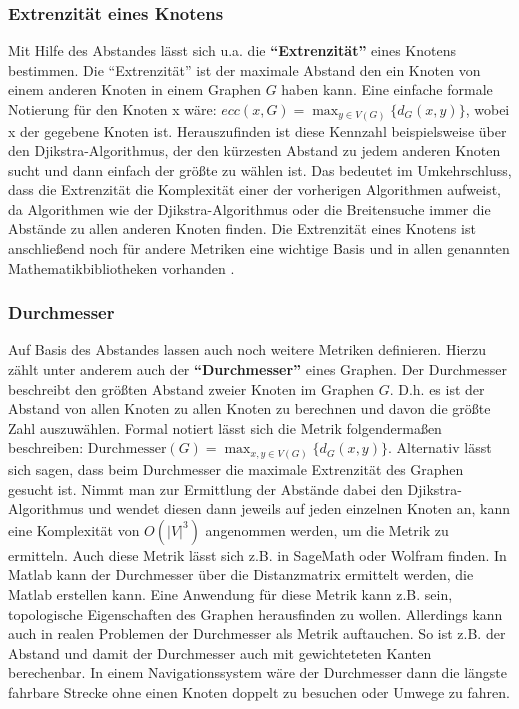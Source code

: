 \documentclass[a4paper,12pt,ngerman,chapterprefix=false,listof=totoc,bibliography=totoc]{scrreprt}
\begin{document}
\subsubsection*{Extrenzität eines Knotens}
{
Mit Hilfe des Abstandes lässt sich u.a. die \textbf{"`Extrenzität"'} eines Knotens bestimmen. Die "`Extrenzität"' ist der maximale Abstand den ein Knoten von einem anderen Knoten in einem Graphen \(G\) haben kann. Eine einfache formale Notierung für den Knoten x wäre: \(ecc(x, G)=\max_{y\in V(G)}\{d_G(x,y)\}\), wobei x der gegebene Knoten ist. \cite{harary_graph_2001} Herauszufinden ist diese Kennzahl beispielsweise über den Djikstra-Algorithmus, der den kürzesten Abstand zu jedem anderen Knoten sucht und dann einfach der größte zu wählen ist. Das bedeutet im Umkehrschluss, dass die Extrenzität die Komplexität einer der vorherigen Algorithmen aufweist, da Algorithmen wie der Djikstra-Algorithmus oder die Breitensuche immer die Abstände zu allen anderen Knoten finden. Die Extrenzität eines Knotens ist anschließend noch für andere Metriken eine wichtige Basis und in allen genannten Mathematikbibliotheken vorhanden \cite{sagemath_graph_2020,matlab_shortest_2020,wolfram_graph_2020}.
}
\subsubsection*{Durchmesser}
{
Auf Basis des Abstandes lassen auch noch weitere Metriken definieren. Hierzu zählt unter anderem auch der \textbf{"`Durchmesser"'} eines Graphen. Der Durchmesser beschreibt den größten Abstand zweier Knoten im Graphen \(G\). \cite{diestel_graphentheorie_2000} D.h. es ist der Abstand von allen Knoten zu allen Knoten zu berechnen und davon die größte Zahl auszuwählen. Formal notiert lässt sich die Metrik folgendermaßen beschreiben: \(\text{Durchmesser}(G)=\max_{x,y\in V(G)}\{ d_G (x,y)\}\). Alternativ lässt sich sagen, dass beim Durchmesser die maximale Extrenzität des Graphen gesucht ist. Nimmt man zur Ermittlung der Abstände dabei den Djikstra-Algorithmus und wendet diesen dann jeweils auf jeden einzelnen Knoten an, kann eine Komplexität von \(O(\vert V\vert ^3)\) angenommen werden, um die Metrik zu ermitteln. Auch diese Metrik lässt sich z.B. in SageMath oder Wolfram finden. In Matlab kann der Durchmesser über die Distanzmatrix ermittelt werden, die Matlab erstellen kann. \cite{sagemath_graph_2020,matlab_shortest_2020,wolfram_graph_2020} Eine Anwendung für diese Metrik kann z.B. sein, topologische Eigenschaften des Graphen herausfinden zu wollen. Allerdings kann auch in realen Problemen der Durchmesser als Metrik auftauchen. So ist z.B. der Abstand und damit der Durchmesser auch mit gewichteteten Kanten berechenbar. \cite{sagemath_graph_2020,gitta_durchmesser_2014} In einem Navigationssystem wäre der Durchmesser dann die längste fahrbare Strecke ohne einen Knoten doppelt zu besuchen oder Umwege zu fahren.
}
\end{document}
